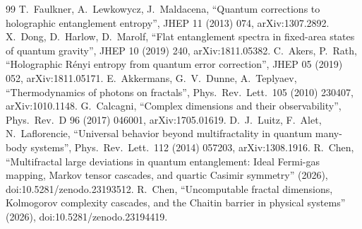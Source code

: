 \documentclass[11pt]{article}
\theoremstyle{definition}\newtheorem{definition}{Definition}[section]
\theoremstyle{remark}\newtheorem*{remark}{Remark}
\begin{document}
\begin{thebibliography}{99}
 T.~Faulkner, A.~Lewkowycz, J.~Maldacena, ``Quantum corrections to holographic entanglement entropy'', JHEP 11 (2013) 074, arXiv:1307.2892.
 X.~Dong, D.~Harlow, D.~Marolf, ``Flat entanglement spectra in fixed-area states of quantum gravity'', JHEP 10 (2019) 240, arXiv:1811.05382.
 C.~Akers, P.~Rath, ``Holographic R\'enyi entropy from quantum error correction'', JHEP 05 (2019) 052, arXiv:1811.05171.
 E.~Akkermans, G.~V.~Dunne, A.~Teplyaev, ``Thermodynamics of photons on fractals'', Phys.\ Rev.\ Lett.\ 105 (2010) 230407, arXiv:1010.1148.
 G.~Calcagni, ``Complex dimensions and their observability'', Phys.\ Rev.\ D 96 (2017) 046001, arXiv:1705.01619.
 D.~J.~Luitz, F.~Alet, N.~Laflorencie, ``Universal behavior beyond multifractality in quantum many-body systems'', Phys.\ Rev.\ Lett.\ 112 (2014) 057203, arXiv:1308.1916.
 R.~Chen, ``Multifractal large deviations in quantum entanglement: Ideal Fermi-gas mapping, Markov tensor cascades, and quartic Casimir symmetry'' (2026), doi:10.5281/zenodo.23193512.
 R.~Chen, ``Uncomputable fractal dimensions, Kolmogorov complexity cascades, and the Chaitin barrier in physical systems'' (2026), doi:10.5281/zenodo.23194419.
\end{thebibliography}
\endgroup
\end{document}
